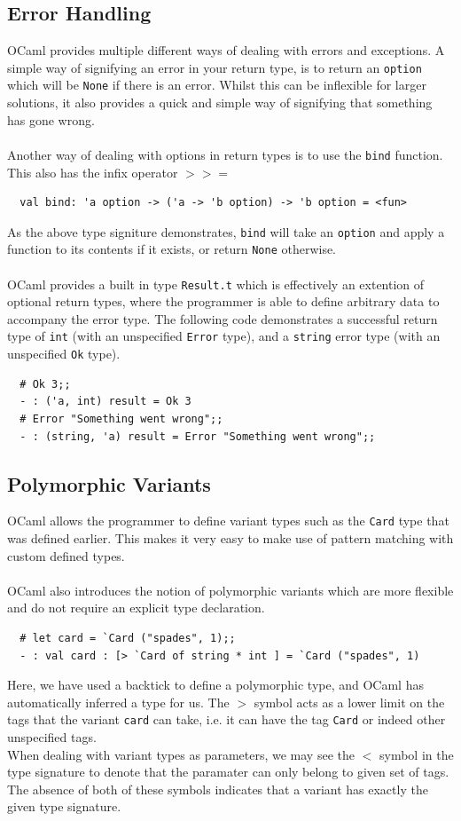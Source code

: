 \documentclass[12pt,a4paper,twoside,openright]{report}
\begin{document}
		\subsection*{Error Handling}
		OCaml provides multiple different ways of dealing with errors and exceptions. 
		A simple way of signifying an error in your return type, is to return an \texttt{option} which will be \texttt{None} if there is an error. 
		Whilst this can be inflexible for larger solutions, it also provides a quick and simple way of signifying that something has gone wrong.\\
		\\
		Another way of dealing with options in return types is to use the \texttt{bind} function. This also has the infix operator $>>=$
		\begin{lstlisting}
  val bind: 'a option -> ('a -> 'b option) -> 'b option = <fun>
		\end{lstlisting} 
		As the above type signiture demonstrates, \texttt{bind} will take an \texttt{option} and apply a function to its contents if it exists, or return \texttt{None} otherwise.\\
		\\
		OCaml provides a built in type \texttt{Result.t} which is effectively an extention of optional return types, where the programmer is able to define arbitrary data to accompany the error type. The following code demonstrates a successful return type of \texttt{int} (with an unspecified \texttt{Error} type), and a \texttt{string} error type (with an unspecified \texttt{Ok} type).
		\begin{lstlisting}
  # Ok 3;;
  - : ('a, int) result = Ok 3
  # Error "Something went wrong";;
  - : (string, 'a) result = Error "Something went wrong";;
		\end{lstlisting} 
		\subsection*{Polymorphic Variants}
		OCaml allows the programmer to define variant types such as the \texttt{Card} type that was defined earlier. This makes it very easy to make use of pattern matching with custom defined types.\\
		\\
		OCaml also introduces the notion of polymorphic variants which are more flexible and do not require an explicit type declaration.
		\begin{lstlisting}
  # let card = `Card ("spades", 1);;
  - : val card : [> `Card of string * int ] = `Card ("spades", 1)
		\end{lstlisting}
		Here, we have used a backtick to define a polymorphic type, and OCaml has automatically inferred a type for us. 
		The $>$ symbol acts as a lower limit on the tags that the variant \texttt{card} can take, i.e. it can have the tag \`\texttt{Card} or indeed other unspecified tags.\\
		When dealing with variant types as parameters, we may see the $<$ symbol in the type signature to denote that the paramater can only belong to given set of tags. The absence of both of these symbols indicates that a variant has exactly the given type signature. 
\end{document}
